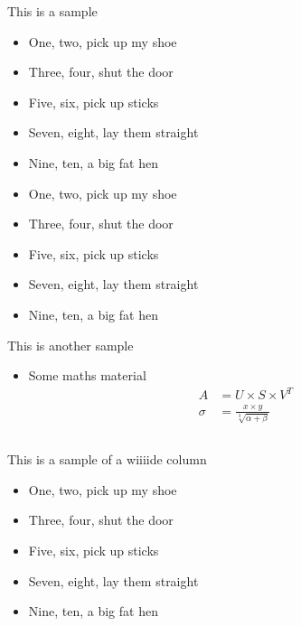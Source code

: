 \documentclass{beamer}
\begin{document}
\begin{frame}[fragile]
\begin{columns}[T]
\begin{column}{.46\textwidth}
			\begin{block}{This is a sample}
				\begin{itemize}
					\item One, two, pick up my shoe
					\item Three, four, shut the door
					\item Five, six, pick up sticks
					\item Seven, eight, lay them straight
					\item Nine, ten, a big fat hen
					\item One, two, pick up my shoe
					\item Three, four, shut the door
					\item Five, six, pick up sticks
					\item Seven, eight, lay them straight
					\item Nine, ten, a big fat hen
				\end{itemize}
			\end{block}


			\begin{block}{This is another sample}
				\begin{itemize}
					\item Some maths material
						\begin{align}
							A &= U \times S \times V^T\\
							\sigma &= \frac{x\times y}{\sqrt[3]{\alpha + \beta}}
						\end{align}
				\end{itemize}
			\end{block}
		\end{column}
	\end{columns}
	\begin{block}{This is a sample of a wiiiide column}
		\begin{itemize}
			\item One, two, pick up my shoe
			\item Three, four, shut the door
			\item Five, six, pick up sticks
			\item Seven, eight, lay them straight
			\item Nine, ten, a big fat hen
		\end{itemize}
	\end{block}
\end{frame}
\end{document}
